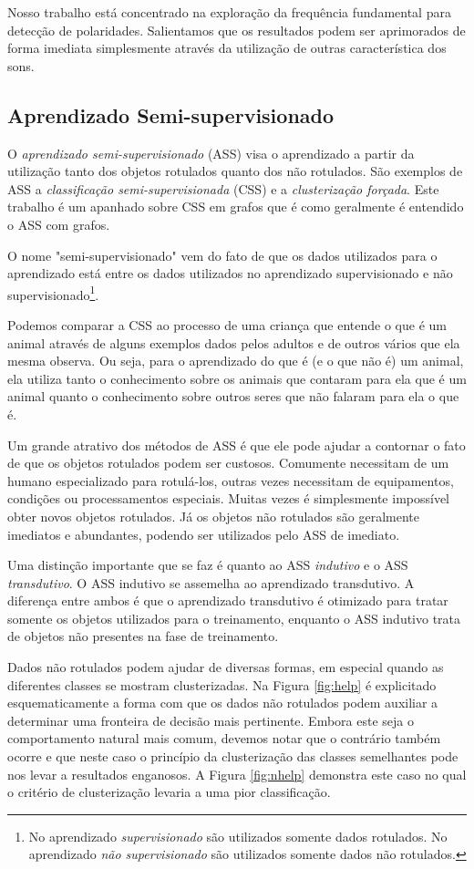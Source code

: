 \documentclass[12pt]{article}
\begin{document}
Nosso trabalho está concentrado na exploração da frequência fundamental para detecção de polaridades. Salientamos que os resultados podem ser aprimorados de forma imediata simplesmente através da utilização de outras característica dos sons.

\subsection{Aprendizado Semi-supervisionado}
O \emph{aprendizado semi-supervisionado} (ASS) visa o aprendizado a partir da utilização tanto dos objetos rotulados quanto dos não rotulados. São exemplos de ASS a \emph{classificação semi-supervisionada} (CSS) e a \emph{clusterização forçada}. Este trabalho é um apanhado sobre CSS em grafos que é como geralmente é entendido o ASS com grafos.

O nome "semi-supervisionado" vem do fato de que os dados utilizados para o aprendizado está entre os dados utilizados no aprendizado supervisionado e não supervisionado\footnote{No aprendizado \emph{supervisionado} são utilizados somente dados rotulados. No aprendizado \emph{não supervisionado} são utilizados somente dados não rotulados.}.

Podemos comparar a CSS ao processo de uma criança que entende o que é um animal através de alguns exemplos dados pelos adultos e de outros vários que ela mesma observa. Ou seja, para o aprendizado do que é (e o que não é) um animal, ela utiliza tanto o conhecimento sobre os animais que contaram para ela que é um animal quanto o conhecimento sobre outros seres que não falaram para ela o que é.

Um grande atrativo dos métodos de ASS é que ele pode ajudar a contornar o fato de que os objetos rotulados podem ser custosos. Comumente necessitam de um humano especializado para rotulá-los, outras vezes necessitam de equipamentos, condições ou processamentos especiais. Muitas vezes é simplesmente impossível obter novos objetos rotulados. Já os objetos não rotulados são geralmente imediatos e abundantes, podendo ser utilizados pelo ASS de imediato.

Uma distinção importante que se faz é quanto ao ASS \emph{indutivo} e o ASS \emph{transdutivo}. O ASS indutivo se assemelha ao aprendizado transdutivo. A diferença entre ambos é que o aprendizado transdutivo é otimizado para tratar somente os objetos utilizados para o treinamento, enquanto o ASS indutivo trata de objetos não presentes na fase de treinamento.

Dados não rotulados podem ajudar de diversas formas, em especial quando as diferentes classes se mostram clusterizadas. Na Figura \ref{fig:help} é explicitado esquematicamente a forma com que os dados não rotulados podem auxiliar a determinar uma fronteira de decisão mais pertinente. Embora este seja o comportamento natural mais comum, devemos notar que o contrário também ocorre e que neste caso o princípio da clusterização das classes semelhantes pode nos levar a resultados enganosos. A Figura \ref{fig:nhelp} demonstra este caso no qual o critério de clusterização levaria a uma pior classificação.
\end{document}
